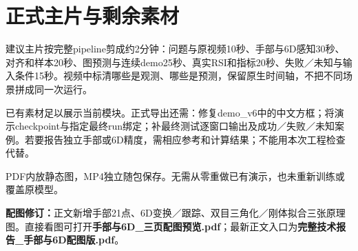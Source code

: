 \documentclass[10pt,a4paper]{ctexart}
\begin{document}
\section{正式主片与剩余素材}
建议主片按完整pipeline剪成约2分钟：问题与原视频10秒、手部与6D感知30秒、对齐和样本20秒、图预测与连续demo25秒、真实RSI和指标20秒、失败／未知与输入条件15秒。视频中标清哪些是观测、哪些是预测，保留原生时间轴，不把不同场景拼成同一次运行。

已有素材足以展示当前模块。正式导出还需：修复demo\_v6中的中文方框；将演示checkpoint与指定最终run绑定；补最终测试逐窗口输出及成功／失败／未知案例。若要报告独立手部或6D精度，需相应参考和计算结果；不能用本次工程检查代替。

PDF内放静态图，MP4独立随包保存。无需从零重做已有演示，也未重新训练或覆盖原模型。

\textbf{配图修订：}正文新增手部21点、6D变换／跟踪、双目三角化／刚体拟合三张原理图。直接看图可打开\textbf{手部与6D\_三页配图预览.pdf}；最新正文入口为\textbf{完整技术报告\_手部与6D配图版.pdf}。
\end{document}
